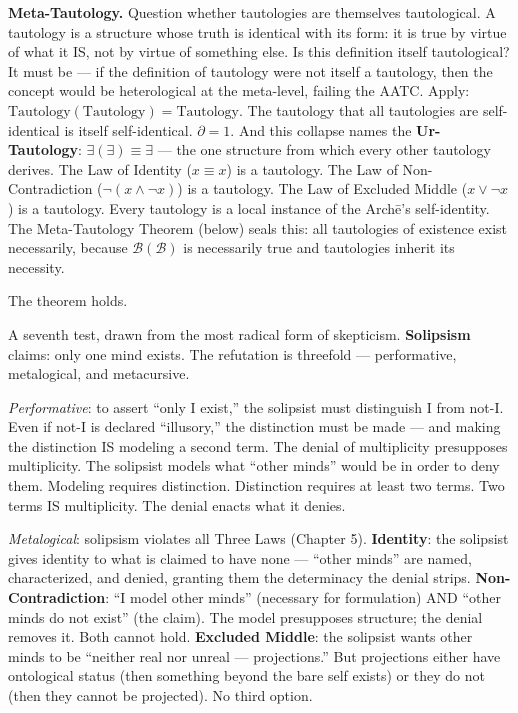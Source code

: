 \documentclass[10pt, openany, oneside]{book}
\begin{document}
\textbf{Meta-Tautology.} Question whether tautologies are themselves tautological. A tautology is a structure whose truth is identical with its form: it is true by virtue of what it IS, not by virtue of something else. Is this definition itself tautological? It must be --- if the definition of tautology were not itself a tautology, then the concept would be heterological at the meta-level, failing the AATC. Apply: $\text{Tautology}(\text{Tautology}) = \text{Tautology}$. The tautology that all tautologies are self-identical is itself self-identical. $\partial = 1$. And this collapse names the \textbf{Ur-Tautology}: $\exists(\exists) \equiv \exists$ --- the one structure from which every other tautology derives. The Law of Identity ($x \equiv x$) is a tautology. The Law of Non-Contradiction ($\neg(x \wedge \neg x)$) is a tautology. The Law of Excluded Middle ($x \vee \neg x$) is a tautology. Every tautology is a local instance of the Arch\={e}'s self-identity. The Meta-Tautology Theorem (below) seals this: all tautologies of existence exist necessarily, because $\mathcal{B}(\mathcal{B})$ is necessarily true and tautologies inherit its necessity.

The theorem holds.

\vspace{0.5em}

A seventh test, drawn from the most radical form of skepticism. \textbf{Solipsism} claims: only one mind exists. The refutation is threefold --- performative, metalogical, and metacursive.

\textit{Performative}: to assert ``only I exist,'' the solipsist must distinguish I from not-I. Even if not-I is declared ``illusory,'' the distinction must be made --- and making the distinction IS modeling a second term. The denial of multiplicity presupposes multiplicity. The solipsist models what ``other minds'' would be in order to deny them. Modeling requires distinction. Distinction requires at least two terms. Two terms IS multiplicity. The denial enacts what it denies.

\textit{Metalogical}: solipsism violates all Three Laws (Chapter 5). \textbf{Identity}: the solipsist gives identity to what is claimed to have none --- ``other minds'' are named, characterized, and denied, granting them the determinacy the denial strips. \textbf{Non-Contradiction}: ``I model other minds'' (necessary for formulation) AND ``other minds do not exist'' (the claim). The model presupposes structure; the denial removes it. Both cannot hold. \textbf{Excluded Middle}: the solipsist wants other minds to be ``neither real nor unreal --- projections.'' But projections either have ontological status (then something beyond the bare self exists) or they do not (then they cannot be projected). No third option.
\end{document}
